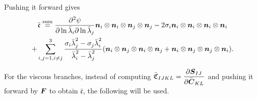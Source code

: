 \documentclass[11pt,twoside,TimesRoman]{article}
\newcommand{\parder}[2]{{\dfrac{\partial #1}{\partial #2}}}
\begin{document}
Pushing it forward gives
\begin{multline}
\bar{\mathfrak{c}} \stackrel{\text{sum}}{=} \parder{^2\psi}{\ln \lambdabar_i \partial \ln \lambdabar_j} \bfn_i \otimes \bfn_i \otimes \bfn_j \otimes \bfn_j - 2\sigma_i \bfn_i \otimes \bfn_i \otimes \bfn_i \otimes \bfn_i\\
+ \sum_{i,j=1, i\neq j}^{3} \frac{\sigma_i \lambdabar_j^2 -\sigma_j \lambdabar_i^2}{\lambdabar_i^2 - \lambdabar_j^2}(\bfn_i \otimes \bfn_j \otimes \bfn_i \otimes \bfn_j + \bfn_i \otimes \bfn_j \otimes \bfn_j \otimes \bfn_i).
\end{multline}

For the viscous branches, instead of computing $\bar{\mathfrak{C}}_{IJKL} = \parder{\bfS_{IJ}}{\bfCbar_{KL}}$ and pushing it forward by $\mbox{\boldmath $F$}$ to obtain $	\bar{\mathfrak{c}}$, the following will be used. 
\end{document}
